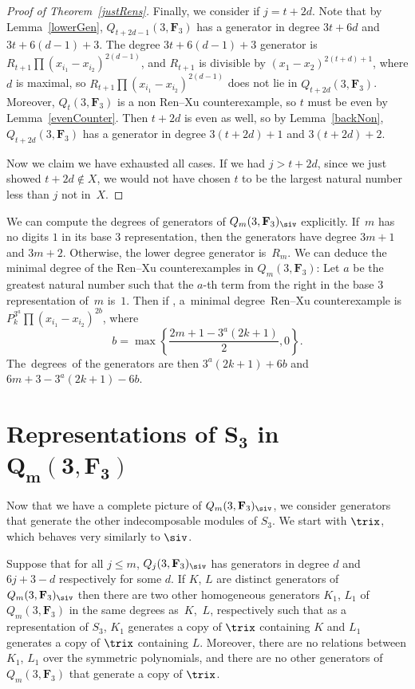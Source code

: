 \begin{proof}[Proof of Theorem~\ref{justRens}]
 Finally, we consider if $j=t+2d$. Note that by Lemma~\ref{lowerGen}, $Q_{t+2d-1}(3,\mathbf{F}_3)$ has a generator in degree $3t+6d$ and $3t+6(d-1)+3$. The degree $3t+6(d-1)+3$ generator is $R_{t+1}\prod (x_{i_1}-x_{i_2})^{2(d-1)}$, and $R_{t+1}$ is divisible by $(x_1-x_2)^{2(t+d)+1}$, where $d$ is maximal, so $R_{t+1}\prod (x_{i_1}-x_{i_2})^{2(d-1)}$ does not lie in $Q_{t+2d}(3,\mathbf{F}_3)$. Moreover, $Q_{t}(3,\mathbf{F}_3)$ is a non Ren--Xu counterexample, so $t$ must be even by Lemma~\ref{evenCounter}. Then $t+2d$ is even as well, so by Lemma~\ref{backNon}, $Q_{t+2d}(3,\mathbf{F}_3)$ has a generator in degree $3(t+2d)+1$ and $3(t+2d)+2$.

 Now we claim we have exhausted all cases. If we had $j>t+2d$, since we just showed ${t+2d\not\in X}$, we would not have chosen $t$ to be the largest natural number less than $j$ not in~$X$.
\end{proof}

\begin{Remark}
 We can compute the degrees of generators of $Q_m(3,\mathbf{F}_3)_{\siv}$ explicitly. If~$m$ has no digits $1$ in its base $3$ representation, then the generators have degree $3m+1$ and $3m+2$. Otherwise, the lower degree generator is~$R_m$. We can deduce the minimal degree of the \mbox{Ren--Xu} counterexamples in $Q_m(3,\mathbf{F}_3)$: Let $a$ be the greatest natural number such that the $a$-th term from the right in the base $3$ representation of~$m$ is~$1$. Then if , \mbox{a~minimal} deg\-ree~Ren--Xu counterexample is $P_k^{3^a}\prod(x_{i_1}-x_{i_2})^{2b}$, where
 \[
 b=\max\left\{\frac{2m+1-3^a(2k+1)}{2},0\right\}.
 \]
 The~deg\-rees~of the generators are then $3^a(2k+1)+6b$ and $6m+3-3^a(2k+1)-6b$.
\end{Remark}

\section[Representations of S\_3 in Q\_m(3,F)]{Representations of $\boldsymbol{S_3}$ in $\boldsymbol{Q_m(3,\mathbf{F}_3)}$}\label{sec:reps}

Now that we have a complete picture of $Q_m(3,\mathbf{F}_3)_\siv$, we consider generators that generate the other indecomposable modules of $S_3$. We start with $\trix$, which behaves very similarly to $\siv$.

 \begin{Proposition}\label{prop:trix}
 Suppose that for all $j\leq m$, $Q_j(3,\mathbf{F}_3)_\siv$ has generators in degree $d$ and $6j+3-d$ respectively for some $d$. If $K$, $L$ are distinct generators of $Q_m(3,\mathbf{F}_3)_\siv$ then there are two other homogeneous generators $K_1$, $L_1$ of $Q_m(3,\mathbf{F}_3)$ in the same degrees as~$K$,~$L$, respectively such that as a representation of $S_3$, $K_1$ generates a copy of $\trix$ containing $K$ and $L_1$ generates a copy of $\trix$ containing $L$. Moreover, there are no relations between $K_1$, $L_1$ over the symmetric polynomials, and there are no other generators of $Q_m(3,\mathbf{F}_3)$ that generate a copy of $\trix$.
 \end{Proposition}


